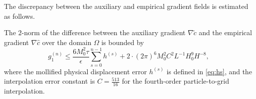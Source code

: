 \documentclass[review,onefignum,onetabnum]{siamart250211}
\begin{document}
The discrepancy between the auxiliary and empirical gradient fields is estimated as follows.
\begin{lemma}
\label{lem:grad_c}
The $2$-norm of the difference between the auxiliary gradient \( \nabla \tilde{c}\) and the empirical gradient \(\nabla \hat{c}\) over the domain $\Omega$ is bounded by
\begin{equation}
\label{eq:gradc_bound}
g_1^{(n)} 
\leq \frac{6M_0^2 \tau}{\epsilon} \sum_{s=0}^{n-1} h^{(s)} + 2 \cdot (2\pi)^6 M_0^2 C^2 L^{-1} H_0^9 H^{-8},
\end{equation}
where the mollified physical displacement error $h^{(s)}$ is defined in \eqref{eq:hs}, and the interpolation error constant is  \(C = \frac{513}{16}\) for the fourth-order particle-to-grid interpolation.
\end{lemma}
\end{document}

